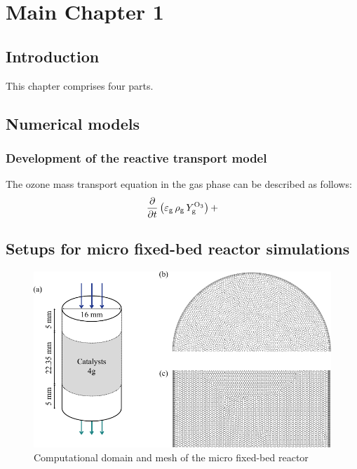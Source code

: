 \chapter{Main Chapter 1}
\label{chap: reactive transport model}
\begin{refsection}
\normalsize

\section{Introduction}

This chapter comprises four parts. 

\section{Numerical models}
\label{sec:Chap1: numerical models}

\subsection{Development of the reactive transport model}
The ozone mass transport equation in the gas phase can be described as follows: 
\begin{equation}
    \pdv{t} \left( \varepsilon_{\mathrm{g}}\,\rho_{\mathrm{g}}\,Y_{\mathrm{g}}^{\ce{O3}} \right)
    + 
    \label{eqn:Chap1: mass transport equation without rxn term}
\end{equation}


\section{Setups for micro fixed-bed reactor simulations}
\label{sec:Chap1: micro-reactor simulations}
\begin{figure}[htbp]
    \centering
    \includegraphics[width=.85\textwidth]{fig/chap_RxnMod-mesh_fixed_bed.pdf}
    \caption{Computational domain and mesh of the micro fixed-bed reactor}
    \label{fig:Chap1: mesh of micro-reactor}
\end{figure}


\end{refsection}
